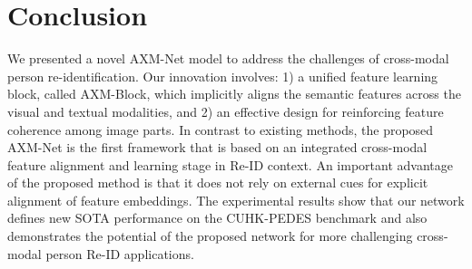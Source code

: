 \documentclass[letterpaper]{article} \usepackage{aaai22}  \usepackage{times}  \usepackage{helvet}  \usepackage{courier}  \usepackage[hyphens]{url}  \usepackage{graphicx} \urlstyle{rm} \def\UrlFont{\rm}  \usepackage{natbib}  \usepackage{caption} \DeclareCaptionStyle{ruled}{labelfont=normalfont,labelsep=colon,strut=off} \frenchspacing  \setlength{\pdfpagewidth}{8.5in}  \setlength{\pdfpageheight}{11in}  \usepackage{algorithm}
\begin{document}
\begin{table}[!htbp]
\centering
{}
\caption{Effect of choice of language embedding.}
\label{tab:wordEmbed}
\end{table}



\begin{comment}
\subsection{Visualisation} \label{sec:Visualisation}
We show the visual attention maps for the baseline network and our proposed AXM-Net in Figure~\ref{attn_visual}. The visualisations are arranged in three columns (a,b,c), highlighting different aspects of a retrieval system. In all three columns, we observe that AXM-Net ignores person's background with high confidence. Specifically, in the column (b), top example, we note that the attention is focused on the lady, whose description is provided, while the baseline model generates a spanned attention. In the column (c), we  observe that with the help of the textual description, the visual attention is refined to minute details in the image like `backpack with a white stripe' and `flip flops'. Overall, the semantic information present in the textual description is highly emphasised across vision, which verifies the feature alignment induced by the inter-modal semantic alignment. Note that the baseline network also has access to multi-scale information, but the proposed method has intelligently aligned this information. We provide query and output retrieval images in the supplementary materials.
\end{comment}
\section{Conclusion}

We presented a novel AXM-Net model to address the challenges of cross-modal person re-identification. Our innovation involves: 1) a unified feature learning block, called AXM-Block, which implicitly aligns the semantic features across the visual and textual modalities, and 2) an effective design for reinforcing feature coherence among image parts. In contrast to existing methods, the proposed AXM-Net is the first framework that is based on an integrated cross-modal feature alignment and learning stage in Re-ID context. An important advantage of the proposed method is that it does not rely on external cues for explicit alignment of feature embeddings. The experimental results show that our network defines new SOTA performance on the CUHK-PEDES benchmark and also demonstrates the potential of the proposed network for more challenging cross-modal person Re-ID applications.
\end{document}

